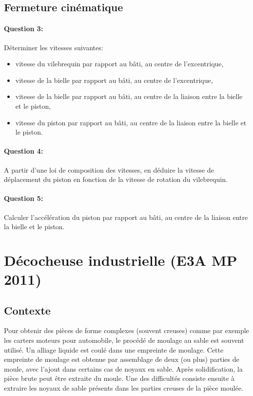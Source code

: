 \subsection{Fermeture cinématique}

\paragraph{Question 3:} Déterminer les vitesses suivantes:
\begin{itemize}
 \item vitesse du vilebrequin par rapport au bâti, au centre de l'excentrique,
 \item vitesse de la bielle par rapport au bâti, au centre de l'excentrique,
 \item vitesse de la bielle par rapport au bâti, au centre de la liaison entre la bielle et le piston,
 \item vitesse du piston par rapport au bâti, au centre de la liaison entre la bielle et le piston.
 \end{itemize}

\paragraph{Question 4:} A partir d'une loi de composition des vitesses, en déduire la vitesse de déplacement du piston en fonction de la vitesse de rotation du vilebrequin.

\paragraph{Question 5:} Calculer l'accélération du piston par rapport au bâti, au centre de la liaison entre la bielle et le piston.

\newpage

\section{Décocheuse industrielle (E3A MP 2011)}

\subsection{Contexte}

Pour obtenir des pièces de forme complexes (souvent creuses) comme par exemple les carters moteurs pour automobile, le procédé de moulage au sable est souvent utilisé. Un alliage liquide est coulé dans une empreinte de moulage. Cette empreinte de moulage est obtenue par assemblage de deux (ou plus) parties de moule, avec l'ajout dans certains cas de noyaux en sable. Après solidification, la pièce brute peut être extraite du moule. Une des difficultés consiste ensuite à extraire les noyaux de sable présents dans les parties creuses de la pièce moulée.

